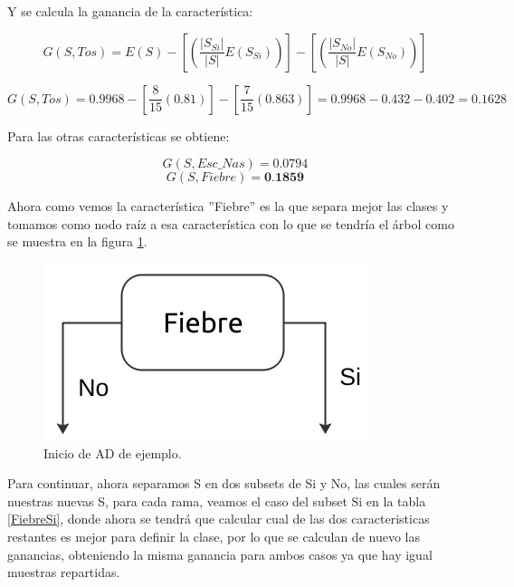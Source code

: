 \documentclass[twoside,spanish,ESP,MSc]{plantillaLabUPV}
\theoremstyle{definition}
\begin{document}
Y se calcula la ganancia de la característica:

$$G(S,Tos) = E(S) - \left[\left(\frac{|S_{Si}|}{|S|} E(S_{Si})\right) \right] - \left[\left(\frac{|S_{No}|}{|S|} E(S_{No})\right) \right] $$

$$G(S,Tos) = 0.9968 - \left[\frac{8}{15} (0.81) \right] - \left[\frac{7}{15} (0.863) \right] = 0.9968 - 0.432 - 0.402 = 0.1628$$

Para las otras características se obtiene:

$$G(S,Esc\_Nas) = 0.0794$$
$$G(S,Fiebre) = \textbf{0.1859}$$

Ahora como vemos la característica ''Fiebre'' es la que separa mejor las clases y tomamos como nodo raíz a esa característica con lo que se tendría el árbol como se muestra en la figura \ref{arbolito}.

\begin{figure}[h] 
	\centering 
	\includegraphics[scale=.4]{edrawimas/arbolito} 
	\caption{Inicio de AD de ejemplo.} 
	\label{arbolito} 
\end{figure}

Para continuar, ahora separamos S en dos subsets de Si y No, las cuales serán nuestras nuevas S, para cada rama, veamos el caso del subset Si en la tabla \ref{FiebreSi}, donde ahora se tendrá que calcular cual de las dos caracteristicas restantes es mejor para definir la clase, por lo que se calculan de nuevo las ganancias, obteniendo la misma ganancia para ambos casos ya que hay igual muestras repartidas.
\end{document}
